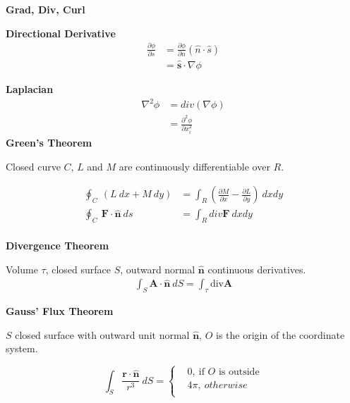 \documentclass{article}
\begin{document}
\noindent
\Large{\textbf{Grad, Div, Curl}}
\newline

\textbf{Directional Derivative}
\begin{align*}
    \frac{\partial \phi}{\partial s} &= \frac{\partial \phi}{\partial n} (\hat{n} \cdot  \hat{s}) \\
                                     &= \mathbf{\hat{s}} \cdot \nabla \phi
\end{align*}

\textbf{Laplacian}
\begin{align*}
    \nabla^2 \phi &= div(\nabla \phi) \\
                  &= \frac{\partial^2 \phi }{\partial x_i^2}
\end{align*}  
\noindent
\textbf{Green's Theorem}  
\begin{flushleft}
Closed curve $C$, $L$ and $M$ are continuously differentiable over $R$. 
\end{flushleft} 
\begin{align*}
    \oint_{C} \  (L \ dx + M \ dy) &= \int_{R} (\frac{\partial M}{\partial x}-\frac{\partial L}{\partial y}) \ dxdy \\
    \oint_{C} \  \mathbf{F} \cdot \mathbf{\hat{n}} \ ds &= \int_R div \mathbf{F} \  dxdy \\
\end{align*}
\newline
\newline

\noindent
\textbf{Divergence Theorem}  

Volume $\tau$, closed surface $S$, outward normal $\mathbf{\hat{n}}$ 
continuous derivatives.
\begin{align*}
    \int_S \mathbf{A} \cdot \mathbf{\hat{n}} \ dS= \int_{\tau} \text{div} \mathbf{A}
\end{align*}  
\newline

\noindent
\textbf{Gauss' Flux Theorem}  

\begin{flushleft}
    $S$ closed surface with outward unit normal $\mathbf{\hat{n}}$, $O$ is the origin of the coordinate system.
\end{flushleft} 
\begin{equation}
    \int_S \frac{\mathbf{r} \cdot \mathbf{\hat{n}}}{r^3} \ dS= 
    \begin{cases}
        & 0, \ \text{if $O$ is outside} \\
        & 4\pi, \ otherwise \\
    \end{cases}
\end{equation}  
\newline
\end{document}
